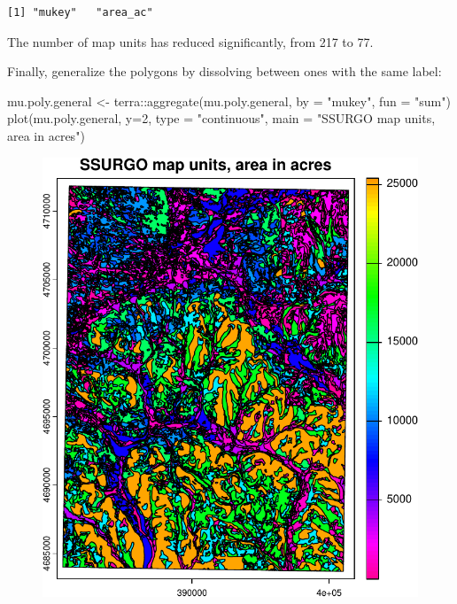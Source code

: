 \documentclass[
  letterpaper,
  DIV=11,
  numbers=noendperiod]{scrartcl}
\newenvironment{Shaded}{\begin{snugshade}}{\end{snugshade}}
\newcommand{\AttributeTok}[1]{\textcolor[rgb]{0.40,0.45,0.13}{#1}}
\newcommand{\DecValTok}[1]{\textcolor[rgb]{0.68,0.00,0.00}{#1}}
\newcommand{\FunctionTok}[1]{\textcolor[rgb]{0.28,0.35,0.67}{#1}}
\newcommand{\NormalTok}[1]{\textcolor[rgb]{0.00,0.23,0.31}{#1}}
\newcommand{\OtherTok}[1]{\textcolor[rgb]{0.00,0.23,0.31}{#1}}
\newcommand{\SpecialCharTok}[1]{\textcolor[rgb]{0.37,0.37,0.37}{#1}}
\newcommand{\StringTok}[1]{\textcolor[rgb]{0.13,0.47,0.30}{#1}}
\begin{document}
\begin{verbatim}
[1] "mukey"   "area_ac"
\end{verbatim}

The number of map units has reduced significantly, from 217 to 77.

Finally, generalize the polygons by dissolving between ones with the
same label:

\begin{Shaded}
\begin{Highlighting}[]
\NormalTok{mu.poly.general }\OtherTok{\textless{}{-}}\NormalTok{ terra}\SpecialCharTok{::}\FunctionTok{aggregate}\NormalTok{(mu.poly.general,}
                                    \AttributeTok{by =} \StringTok{"mukey"}\NormalTok{,}
                                    \AttributeTok{fun =} \StringTok{"sum"}\NormalTok{)}
\FunctionTok{plot}\NormalTok{(mu.poly.general, }\AttributeTok{y=}\DecValTok{2}\NormalTok{,}
     \AttributeTok{type =} \StringTok{"continuous"}\NormalTok{,}
     \AttributeTok{main =} \StringTok{"SSURGO map units, area in acres"}\NormalTok{)}
\end{Highlighting}
\end{Shaded}

\begin{figure}[H]

{\centering \includegraphics{PatternAnalysisWorkshopTutorial_files/figure-pdf/dissolve-polygons-1.pdf}

}

\end{figure}
\end{document}
